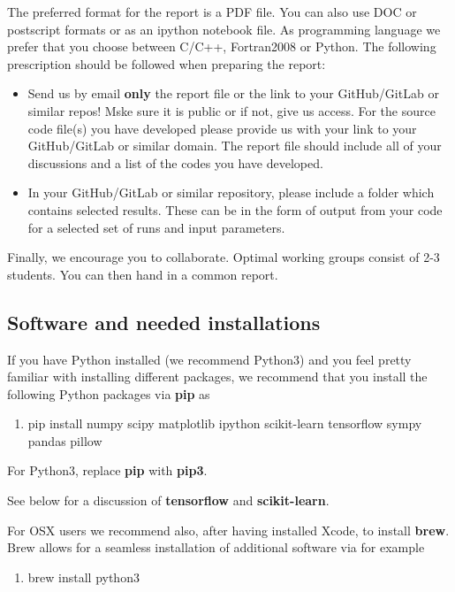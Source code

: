 \documentclass[%
oneside,                 %
final,                   %
10pt]{article}
\begin{document}
The preferred format for the report is a PDF file. You can also use DOC or postscript formats or as an ipython notebook file.  As programming language we prefer that you choose between C/C++, Fortran2008 or Python. The following prescription should be followed when preparing the report:


\begin{itemize}
  \item Send us by email  \textbf{only} the report file or the link to your GitHub/GitLab or similar repos!  Mske sure it is public or if not, give us access. For the source code file(s) you have developed please provide us with your link to your GitHub/GitLab or similar  domain.  The report file should include all of your discussions and a list of the codes you have developed. 

  \item In your GitHub/GitLab or similar repository, please include a folder which contains selected results. These can be in the form of output from your code for a selected set of runs and input parameters.
\end{itemize}

\noindent
Finally, 
we encourage you to collaborate. Optimal working groups consist of 
2-3 students. You can then hand in a common report. 



\subsection{Software and needed installations}

If you have Python installed (we recommend Python3) and you feel pretty familiar with installing different packages, 
we recommend that you install the following Python packages via \textbf{pip} as
\begin{enumerate}
\item pip install numpy scipy matplotlib ipython scikit-learn tensorflow sympy pandas pillow
\end{enumerate}

\noindent
For Python3, replace \textbf{pip} with \textbf{pip3}.

See below for a discussion of \textbf{tensorflow} and \textbf{scikit-learn}. 

For OSX users we recommend also, after having installed Xcode, to install \textbf{brew}. Brew allows 
for a seamless installation of additional software via for example
\begin{enumerate}
\item brew install python3
\end{enumerate}
\end{document}
